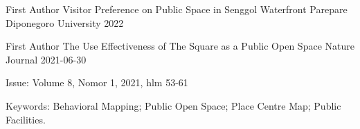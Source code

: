 

\begin{cventries}

  \cventry
    {First Author} %
    {Visitor Preference on Public Space in Senggol Waterfront Parepare} %
    {Diponegoro University} %
    {2022} %
    {}

  \cventry
    {First Author} %
    {The Use Effectiveness of The Square as a Public Open Space} %
    {Nature Journal} %
    {2021-06-30} %
    {
      \begin{cvitems} %
        \item {Issue: Volume 8, Nomor 1, 2021, hlm 53-61}
        \item {Keywords: Behavioral Mapping; Public Open Space; Place Centre Map; Public Facilities. }
      \end{cvitems}
    }

\end{cventries}
